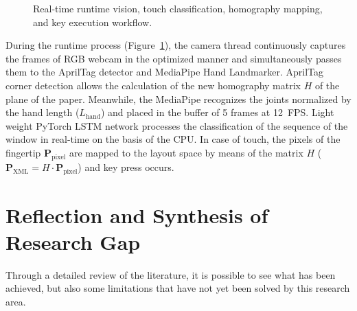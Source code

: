 \begin{figure}[htbp]
{%
}
\caption{Real-time runtime vision, touch classification, homography mapping, and key execution workflow.}
\label{fig:workflow_runtime_pipeline}
\end{figure}

During the runtime process (Figure~\ref{fig:workflow_runtime_pipeline}), the camera thread continuously captures the frames of RGB webcam in the optimized manner and simultaneously passes them to the AprilTag detector and MediaPipe Hand Landmarker. AprilTag corner detection allows the calculation of the new homography matrix $H$ of the plane of the paper. Meanwhile, the MediaPipe recognizes the joints normalized by the hand length ($L_{\text{hand}}$) and placed in the buffer of 5 frames at 12~FPS. Light weight PyTorch LSTM network processes the classification of the sequence of the window in real-time on the basis of the CPU. In case of touch, the pixels of the fingertip $\mathbf{P}_{\text{pixel}}$ are mapped to the layout space by means of the matrix $H$ ($\mathbf{P}_{\text{XML}} = H \cdot \mathbf{P}_{\text{pixel}}$) and key press occurs.

\section{Reflection and Synthesis of Research Gap}
\label{sec:lit_reflection}
Through a detailed review of the literature, it is possible to see what has been achieved, but also some limitations that have not yet been solved by this research area.


